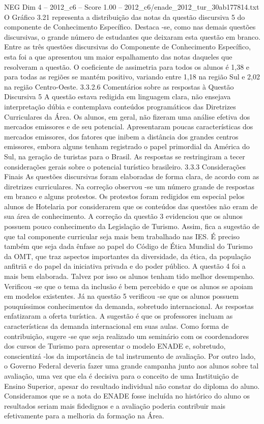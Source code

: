 \begin{textsample}{NEG Dim 4 – 2012\_c6 – Score 1.00 – 2012\_c6/enade\_2012\_tur\_30ab177814.txt}
O Gráfico 3.21 representa a distribuição das notas da questão discursiva 5 do componente de Conhecimento Específico.
Destaca -se, como nas demais questões discursivas, o grande número de estudantes que deixaram esta questão em branco.
Entre as três questões discursivas do Componente de Conhecimento Específico, esta foi a que apresentou um maior espalhamento das notas daqueles que resolveram a questão.
O coeficiente de assimetria para todos os alunos é 1,38 e para todas as regiões se mantém positivo, variando entre 1,18 na região Sul e 2,02 na região Centro-Oeste. 3.3.2.6 Comentários sobre as respostas à Questão Discursiva 5 A questão estava redigida em linguagem clara, não ensejava interpretação dúbia e contemplava conteúdos programáticos das Diretrizes Curriculares da Área.
Os alunos, em geral, não fizeram uma análise efetiva dos mercados emissores e de seu potencial.
Apresentaram poucas características dos mercados emissores, dos fatores que inibem a distância dos grandes centros emissores, embora alguns tenham registrado o papel primordial da América do Sul, na geração de turistas para o Brasil.
As respostas se restringiram a tecer considerações gerais sobre o potencial turístico brasileiro. 3.3.3 Considerações Finais As questões discursivas foram elaboradas de forma clara, de acordo com as diretrizes curriculares.
Na correção observou -se um número grande de respostas em branco e alguns protestos.
Os protestos foram redigidos em especial pelos alunos de Hotelaria por considerarem que os conteúdos das questões não eram de sua área de conhecimento.
A correção da questão 3 evidenciou que os alunos possuem pouco conhecimento da Legislação de Turismo.
Assim, fica a sugestão de que tal componente curricular seja mais bem trabalhado nas IES.
É preciso também que seja dada ênfase ao papel do Código de Ética Mundial do Turismo da OMT, que traz aspectos importantes da diversidade, da ética, da população anfitriã e do papel da iniciativa privada e do poder público.
A questão 4 foi a mais bem elaborada.
Talvez por isso os alunos tenham tido melhor desempenho.
Verificou -se que o tema da inclusão é bem percebido e que os alunos se apoiam em modelos existentes.
Já na questão 5 verificou -se que os alunos possuem pouquíssimos conhecimentos da demanda, sobretudo internacional.
As respostas enfatizaram a oferta turística.
A sugestão é que os professores incluam as características da demanda internacional em suas aulas.
Como forma de contribuição, sugere -se que seja realizado um seminário com os coordenadores dos cursos de Turismo para apresentar o modelo ENADE e, sobretudo, conscientizá -los da importância de tal instrumento de avaliação.
Por outro lado, o Governo Federal deveria fazer uma grande campanha junto aos alunos sobre tal avaliação, uma vez que ela é decisiva para o conceito de uma Instituição de Ensino Superior, apesar do resultado individual não constar do diploma do aluno.
Consideramos que se a nota do ENADE fosse incluída no histórico do aluno os resultados seriam mais fidedignos e a avaliação poderia contribuir mais efetivamente para a melhoria da formação na Área.

\end{textsample}
